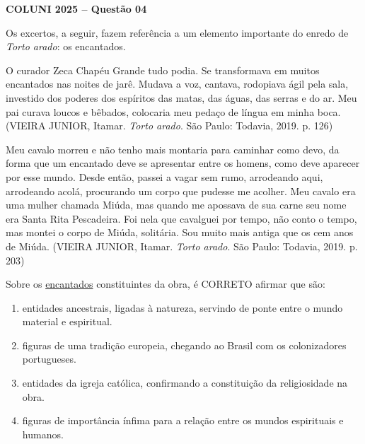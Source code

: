 \textbf{COLUNI 2025 -- Questão 04}\par\medskip Os excertos, a seguir, fazem referência a um elemento importante do enredo de \textit{Torto arado}: os encantados.

\par

O curador Zeca Chapéu Grande tudo podia. Se transformava em muitos encantados nas noites de jarê. Mudava a voz, cantava, rodopiava ágil pela sala, investido dos poderes dos espíritos das matas, das águas, das serras e do ar. Meu pai curava loucos e bêbados, colocaria meu pedaço de língua em minha boca. (VIEIRA JUNIOR, Itamar. \textit{Torto arado}. São Paulo: Todavia, 2019. p. 126)

\par

Meu cavalo morreu e não tenho mais montaria para caminhar como devo, da forma que um encantado deve se apresentar entre os homens, como deve aparecer por esse mundo. Desde então, passei a vagar sem rumo, arrodeando aqui, arrodeando acolá, procurando um corpo que pudesse me acolher. Meu cavalo era uma mulher chamada Miúda, mas quando me apossava de sua carne seu nome era Santa Rita Pescadeira. Foi nela que cavalguei por tempo, não conto o tempo, mas montei o corpo de Miúda, solitária. Sou muito mais antiga que os cem anos de Miúda. (VIEIRA JUNIOR, Itamar. \textit{Torto arado}. São Paulo: Todavia, 2019. p. 203)

\par

Sobre os \underline{encantados} constituintes da obra, é CORRETO afirmar que são:\begin{enumerate}
\item entidades ancestrais, ligadas à natureza, servindo de ponte entre o mundo material e espiritual.
\item figuras de uma tradição europeia, chegando ao Brasil com os colonizadores portugueses.
\item entidades da igreja católica, confirmando a constituição da religiosidade na obra.
\item figuras de importância ínfima para a relação entre os mundos espirituais e humanos.\end{enumerate}
